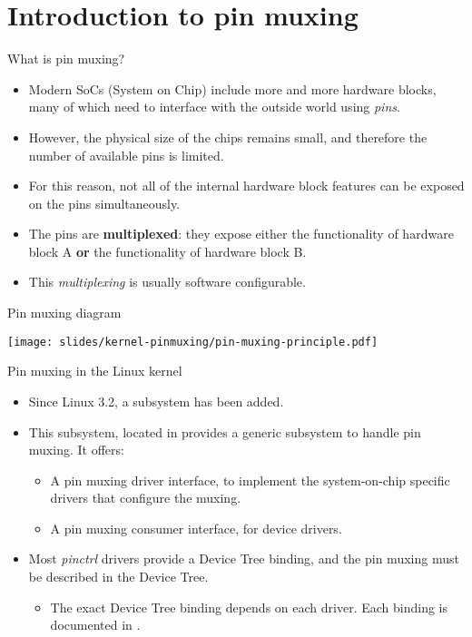 \section{Introduction to pin muxing}

\begin{frame}{What is pin muxing?}
  \begin{itemize}
  \item Modern SoCs (System on Chip) include more and more hardware
    blocks, many of which need to interface with the outside world
    using {\em pins}.
  \item However, the physical size of the chips remains small, and
    therefore the number of available pins is limited.
  \item For this reason, not all of the internal hardware block
    features can be exposed on the pins simultaneously.
  \item The pins are {\bf multiplexed}: they expose either the
    functionality of hardware block A {\bf or} the functionality of
    hardware block B.
  \item This {\em multiplexing} is usually software configurable.
  \end{itemize}
\end{frame}

\begin{frame}{Pin muxing diagram}
  \begin{center}
    \texttt{[image: slides/kernel-pinmuxing/pin-muxing-principle.pdf]}
  \end{center}
\end{frame}

\begin{frame}{Pin muxing in the Linux kernel}
  \begin{itemize}
  \item Since Linux 3.2, a  subsystem has been added.
  \item This subsystem, located in  provides a
    generic subsystem to handle pin muxing. It offers:
    \begin{itemize}
    \item A pin muxing driver interface, to implement the system-on-chip
      specific drivers that configure the muxing.
    \item A pin muxing consumer interface, for device drivers.
    \end{itemize}
  \item Most {\em pinctrl} drivers provide a Device Tree binding, and
    the pin muxing must be described in the Device Tree.
    \begin{itemize}
    \item The exact Device Tree binding depends on each driver. Each
      binding is documented in
      .
    \end{itemize}
  \end{itemize}
\end{frame}

